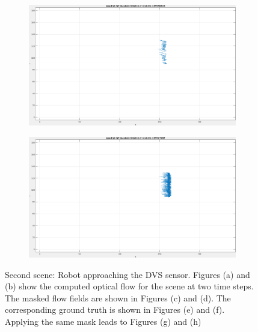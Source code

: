 \begin{figure}[tb]
\begin{subfigure}{.45\textwidth}
  \caption{}
\end{subfigure}
\begin{subfigure}{.45\textwidth}
  \centering
  \includegraphics[height=.6\linewidth]{figs/quadrat/quadrat-GT-masked-1.png}
  \caption{}
\end{subfigure}
\begin{subfigure}{.45\textwidth}
  \centering
  \includegraphics[height=.6\linewidth]{figs/quadrat/quadrat-GT-masked-2.png}
  \caption{}
\end{subfigure}
\caption[First scene: Robot approaching the DVS sensor.]{Second scene: Robot approaching the DVS sensor.
Figures (a) and (b) show the computed optical flow for the scene at two time steps. The masked flow fields are shown in Figures (c) and (d).
The corresponding ground truth is shown in Figures (e) and (f). Applying the same mask leads to Figures (g) and (h)}
\label{fig:quadrat-snapshots}
\end{figure}


